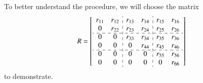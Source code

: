 \documentclass[3p]{elsarticle}
\numberwithin{equation}{section}
\begin{document}
To better understand the procedure, we will choose the matrix 
\[R= \begin{bmatrix}
\begin{array}{cc:cc:cc}
 r_{11} & r_{12} & r_{13} & r_{14} & r_{15} & r_{16}\\
 0 & r_{22} & r_{23} & r_{24} & r_{25} & r_{26}\\
 \cdashline{1-6}
 0      & 0      & r_{33} & r_{34} & r_{35} & r_{36}\\
 0      & 0      & 0 & r_{44} & r_{45} & r_{46}\\
 \cdashline{1-6}
 0      & 0      & 0      & 0      & r_{55} & r_{56}\\
 0      & 0      & 0      & 0      & 0 & r_{66}\\
\end{array}
\end{bmatrix}
\]
to demonstrate. 
\end{document}
